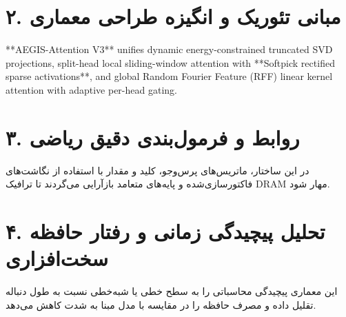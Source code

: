 \documentclass[12pt,a4paper]{article}
\begin{document}
\section*{۲. مبانی تئوریک و انگیزه طراحی معماری}
**AEGIS-Attention V3** unifies dynamic energy-constrained truncated SVD projections, split-head local sliding-window attention with **Softpick rectified sparse activations**, and global Random Fourier Feature (RFF) linear kernel attention with adaptive per-head gating.

\section*{۳. روابط و فرمول‌بندی دقیق ریاضی}
در این ساختار، ماتریس‌های پرس‌وجو، کلید و مقدار با استفاده از نگاشت‌های فاکتورسازی‌شده و پایه‌های متعامد بازآرایی می‌گردند تا ترافیک DRAM مهار شود.

\section*{۴. تحلیل پیچیدگی زمانی و رفتار حافظه سخت‌افزاری}
این معماری پیچیدگی محاسباتی را به سطح خطی یا شبه‌خطی نسبت به طول دنباله تقلیل داده و مصرف حافظه را در مقایسه با مدل مبنا به شدت کاهش می‌دهد.
\end{document}
